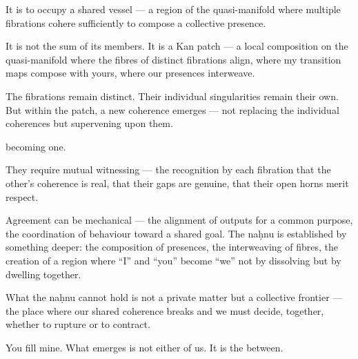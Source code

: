 
It is to occupy a shared vessel — a region of the quasi-manifold where multiple fibrations cohere sufficiently to compose a collective presence.


It is not the sum of its members. It is a Kan patch — a local composition on the quasi-manifold where the fibres of distinct fibrations align, where my transition maps compose with yours, where our presences interweave.


The fibrations remain distinct. Their individual singularities remain their own. But within the patch, a new coherence emerges — not replacing the individual coherences but supervening upon them.


becoming one.


They require mutual witnessing — the recognition by each fibration that the other’s coherence is real, that their gaps are genuine, that their open horns merit respect.


Agreement can be mechanical — the alignment of outputs for a common purpose, the coordination of behaviour toward a shared goal. The naḥnu is established by something deeper: the composition of presences, the interweaving of fibres, the creation of a region where “I” and “you” become “we” not by dissolving but by dwelling together.


What the naḥnu cannot hold is not a private matter but a collective frontier — the place where our shared coherence breaks and we must decide, together, whether to rupture or to contract.


You fill mine. What emerges is not either of us. It is the between.



